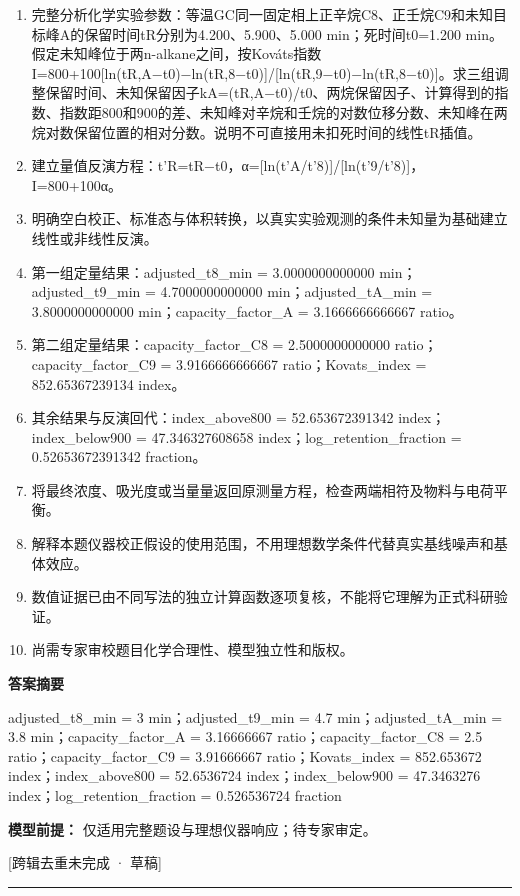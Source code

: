 \documentclass[UTF8,11pt,a4paper]{ctexart}
\begin{document}
\begin{enumerate}
\item 完整分析化学实验参数：等温GC同一固定相上正辛烷C8、正壬烷C9和未知目标峰A的保留时间tR分别为4.200、5.900、5.000 min；死时间t0=1.200 min。假定未知峰位于两n-alkane之间，按Kováts指数I=800+100[ln(tR,A−t0)−ln(tR,8−t0)]/[ln(tR,9−t0)−ln(tR,8−t0)]。求三组调整保留时间、未知保留因子kA=(tR,A−t0)/t0、两烷保留因子、计算得到的指数、指数距800和900的差、未知峰对辛烷和壬烷的对数位移分数、未知峰在两烷对数保留位置的相对分数。说明不可直接用未扣死时间的线性tR插值。
\item 建立量值反演方程：t'R=tR−t0，α=[ln(t'A/t'8)]/[ln(t'9/t'8)]，I=800+100α。
\item 明确空白校正、标准态与体积转换，以真实实验观测的条件未知量为基础建立线性或非线性反演。
\item 第一组定量结果：adjusted\_t8\_min = 3.0000000000000 min；adjusted\_t9\_min = 4.7000000000000 min；adjusted\_tA\_min = 3.8000000000000 min；capacity\_factor\_A = 3.1666666666667 ratio。
\item 第二组定量结果：capacity\_factor\_C8 = 2.5000000000000 ratio；capacity\_factor\_C9 = 3.9166666666667 ratio；Kovats\_index = 852.65367239134 index。
\item 其余结果与反演回代：index\_above800 = 52.653672391342 index；index\_below900 = 47.346327608658 index；log\_retention\_fraction = 0.52653672391342 fraction。
\item 将最终浓度、吸光度或当量量返回原测量方程，检查两端相符及物料与电荷平衡。
\item 解释本题仪器校正假设的使用范围，不用理想数学条件代替真实基线噪声和基体效应。
\item 数值证据已由不同写法的独立计算函数逐项复核，不能将它理解为正式科研验证。
\item 尚需专家审校题目化学合理性、模型独立性和版权。
\end{enumerate}
\noindent\textbf{答案摘要}\par
adjusted\_t8\_min = 3 min；adjusted\_t9\_min = 4.7 min；adjusted\_tA\_min = 3.8 min；capacity\_factor\_A = 3.16666667 ratio；capacity\_factor\_C8 = 2.5 ratio；capacity\_factor\_C9 = 3.91666667 ratio；Kovats\_index = 852.653672 index；index\_above800 = 52.6536724 index；index\_below900 = 47.3463276 index；log\_retention\_fraction = 0.526536724 fraction\par
\noindent\textbf{模型前提：}
仅适用完整题设与理想仪器响应；待专家审定。\par
\noindent\textcolor{red!65!black}{[跨辑去重未完成 · 草稿]} \par
\medskip\hrule\medskip
{}
\end{document}
